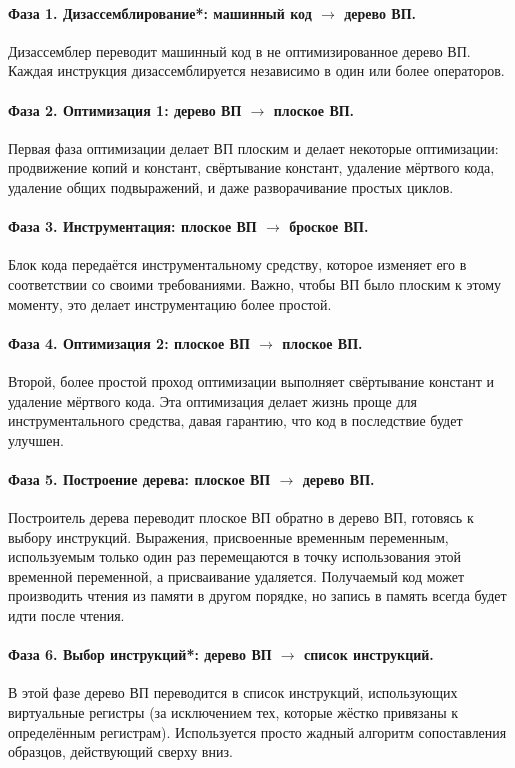 \documentclass[a4paper,12pt,russian]{article}
\begin{document}
\paragraph{Фаза 1. Дизассемблирование*: машинный код $\to$ дерево ВП.}
Дизассемблер переводит машинный код в не оптимизированное дерево ВП. Каждая инструкция дизассемблируется независимо в один или более операторов.

\paragraph{Фаза 2. Оптимизация 1: дерево ВП $\to$ плоское ВП.}
Первая фаза оптимизации делает ВП плоским и делает некоторые оптимизации: продвижение копий и констант, свёртывание констант, удаление мёртвого кода, удаление общих подвыражений, и даже разворачивание простых циклов.

\paragraph{Фаза 3. Инструментация: плоское ВП $\to$ броское ВП.}
Блок кода передаётся инструментальному средству, которое изменяет его в соответствии со своими требованиями. Важно, чтобы ВП было плоским к этому моменту, это делает инструментацию более простой.

\paragraph{Фаза 4. Оптимизация 2: плоское ВП $\to$ плоское ВП.}
Второй, более простой проход оптимизации выполняет свёртывание констант и удаление мёртвого кода. Эта оптимизация делает жизнь проще для инструментального средства, давая гарантию, что код в последствие будет улучшен.

\paragraph{Фаза 5. Построение дерева: плоское ВП $\to$ дерево ВП.}
Построитель дерева переводит плоское ВП обратно в дерево ВП, готовясь к выбору инструкций. Выражения, присвоенные временным переменным, используемым только один раз перемещаются в точку использования этой временной переменной, а присваивание удаляется. Получаемый код может производить чтения из памяти в другом порядке, но запись в память всегда будет идти после чтения.

\paragraph{Фаза 6. Выбор инструкций*: дерево ВП $\to$ список инструкций.}
В этой фазе дерево ВП переводится в список инструкций, использующих виртуальные регистры (за исключением тех, которые жёстко привязаны к определённым регистрам). Используется просто жадный алгоритм сопоставления образцов, действующий сверху вниз.
\end{document}
